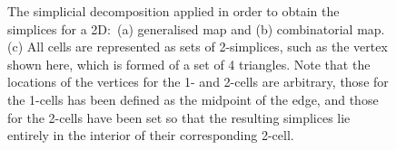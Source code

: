 \begin{figure}[tb]
{\label{subfig:cmaps-simplices}}
\quad
{}
\caption[Simplices in a generalised map and a combinatorial map]{The simplicial decomposition applied in order to obtain the simplices for a 2D:\ (a) generalised map and (b) combinatorial map. (c) All cells are represented as sets of 2-simplices, such as the vertex shown here, which is formed of a set of 4 triangles.
Note that the locations of the vertices for the 1- and 2-cells are arbitrary, those for the 1-cells has been defined as the midpoint of the edge, and those for the 2-cells have been set so that the resulting simplices lie entirely in the interior of their corresponding 2-cell.}
\label{fig:simplices}
\end{figure}

